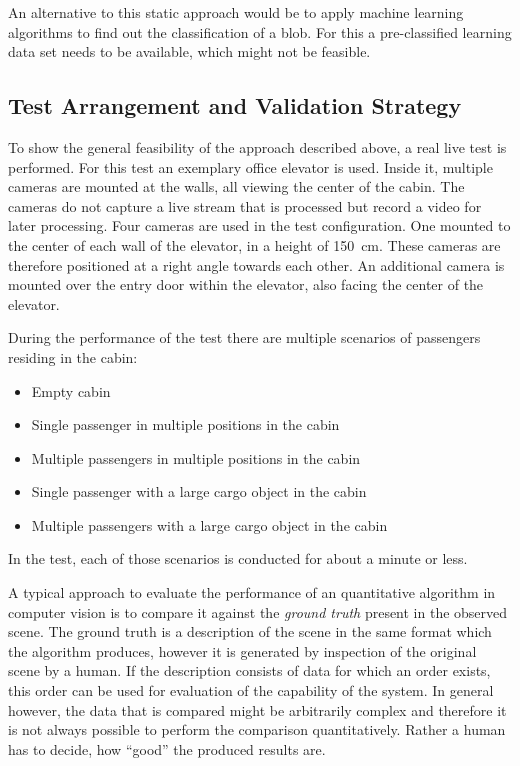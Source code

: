 An alternative to this static approach would be to apply machine learning algorithms to find out the classification of a blob.
For this a pre-classified learning data set needs to be available, which might not be feasible.

\subsection{Test Arrangement and Validation Strategy}
To show the general feasibility of the approach described above, 
a real live test is performed.
For this test an exemplary office elevator is used.
Inside it, multiple cameras are mounted at the walls, 
all viewing the center of the cabin.
The cameras do not capture a live stream that is processed but record a video for later processing.
Four cameras are used in the test configuration.
One mounted to the center of each wall of the elevator, in a height of 150~cm.
These cameras are therefore positioned at a right angle towards each other.
An additional camera is mounted over the entry door within the elevator, also facing the center of the elevator.

During the performance of the test there are multiple scenarios
of passengers residing in the cabin:
\begin{itemize}
    \item Empty cabin
    \item Single passenger in multiple positions in the cabin
    \item Multiple passengers in multiple positions in the cabin
    \item Single passenger with a large cargo object in the cabin
    \item Multiple passengers with a large cargo object in the cabin
\end{itemize}
In the test, each of those scenarios is conducted for about a minute or less.

A typical approach to evaluate the performance of an 
quantitative algorithm in computer vision is to compare it against the \emph{ground truth} present in the observed scene.
The ground truth is a description of the scene in the same format which the algorithm produces, however it is generated by inspection of the original scene by a human.
If the description consists of data for which an order exists, this order can be used for evaluation of the capability of the system.
In general however, the data that is compared might be arbitrarily complex and therefore it is not always possible to perform the comparison quantitatively. Rather a human has to decide, how \enquote{good} the produced results are.


